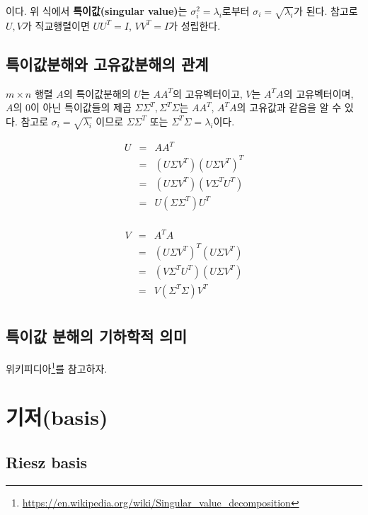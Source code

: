 \documentclass[b5paper,]{book}
\let\rmarkdownfootnote\footnote%
\def\footnote{\protect\rmarkdownfootnote}
\renewcommand{\href}[2]{#2\footnote{\url{#1}}}
\theoremstyle{definition}
\theoremstyle{definition}
\theoremstyle{definition}
\theoremstyle{remark}
\begin{document}
이다. 위 식에서 \textbf{특이값(singular value)}는
\(\sigma_{i}^{2}=\lambda_{i}\)로부터 \(\sigma_{i}=\sqrt{\lambda_{i}}\)가
된다. 참고로 \(U, V\)가 직교행렬이면 \(UU^{T}=I\), \(VV^{T}=I\)가
성립한다.

\subsection{특이값분해와 고유값분해의 관계}\label{--}

\(m\times n\) 행렬 \(A\)의 특이값분해의 \(U\)는 \(AA^{T}\)의
고유벡터이고, \(V\)는 \(A^{T}A\)의 고유벡터이며, \(A\)의 0이 아닌
특이값들의 제곱 \(\Sigma\Sigma^{T}, \Sigma^{T}\Sigma\)는 \(AA^{T}\),
\(A^{T}A\)의 고유값과 같음을 알 수 있다. 참고로
\(\sigma_{i}=\sqrt{\lambda_{i}}\) 이므로 \(\Sigma\Sigma^{T}\) 또는
\(\Sigma^{T}\Sigma=\lambda_{i}\)이다.

\begin{eqnarray*}
U&=&AA^{T}\\
&=&(U\Sigma V^{T})(U\Sigma V^{T})^{T}\\
&=&(U\Sigma V^{T})(V\Sigma^{T} U^{T})\\
&=&U(\Sigma\Sigma^{T})U^{T}\\
\end{eqnarray*}

\begin{eqnarray*}
V&=&A^{T}A\\
&=&(U\Sigma V^{T})^{T}(U\Sigma V^{T})\\
&=&(V\Sigma^{T} U^{T})(U\Sigma V^{T})\\
&=&V(\Sigma^{T}\Sigma)V^{T}\\
\end{eqnarray*}

\subsection{특이값 분해의 기하학적 의미}\label{---}

\href{https://en.wikipedia.org/wiki/Singular_value_decomposition}{위키피디아}를
참고하자.

\section{기저(basis)}\label{basis}

\subsection{Riesz basis}\label{riesz-basis}
\end{document}
